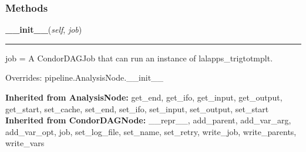   \subsubsection{Methods}

    \label{inspiral:TrigToTmpltNode:__init__}
    \vspace{0.5ex}

    \noindent\begin{boxedminipage}{\textwidth}

    \raggedright \textbf{\_\_init\_\_}(\textit{self}, \textit{job})

    \vspace{-1.5ex}

    \rule{\textwidth}{0.5\fboxrule}
    job = A CondorDAGJob that can run an instance of 
    lalapps\_trigtotmplt.

    \vspace{1ex}

      Overrides: pipeline.AnalysisNode.\_\_init\_\_

    \end{boxedminipage}

  \noindent\textbf{Inherited from AnalysisNode:}
    get\_end,
    get\_ifo,
    get\_input,
    get\_output,
    get\_start,
    set\_cache,
    set\_end,
    set\_ifo,
    set\_input,
    set\_output,
    set\_start
    \\
  \noindent\textbf{Inherited from CondorDAGNode:}
    \_\_repr\_\_,
    add\_parent,
    add\_var\_arg,
    add\_var\_opt,
    job,
    set\_log\_file,
    set\_name,
    set\_retry,
    write\_job,
    write\_parents,
    write\_vars
